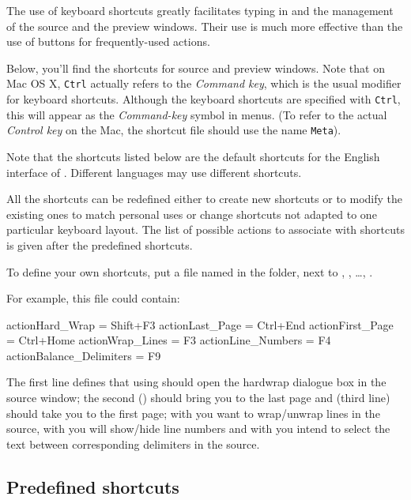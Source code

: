The use of keyboard shortcuts greatly facilitates typing in and the management of the source and the preview windows. Their use is much more effective than the use of buttons for frequently-used actions.

Below, you'll find the shortcuts for source and preview windows. Note that on Mac OS X, \verb|Ctrl| actually refers to the \emph{Command key}, which is the usual modifier for keyboard shortcuts. Although the keyboard shortcuts are specified with \verb|Ctrl|, this will appear as the \emph{Command-key} symbol in menus. (To refer to the actual \emph{Control key} on the Mac, the shortcut file should use the name \verb|Meta|).

Note that the shortcuts listed below are the default shortcuts for the English interface of {\Tw}. Different languages may use different shortcuts.

All the shortcuts can be redefined either to create new shortcuts or to modify the existing ones to match personal uses or change shortcuts not adapted to one particular keyboard layout. The list of possible actions to associate with shortcuts is given after the predefined shortcuts.

To define your own shortcuts, put a file named  in the  folder, next to , , \dots, .

For example, this  file could contain:
\begin{verbExample}
actionHard_Wrap = Shift+F3
actionLast_Page = Ctrl+End
actionFirst_Page = Ctrl+Home
actionWrap_Lines = F3
actionLine_Numbers = F4
actionBalance_Delimiters = F9
\end{verbExample}

The first line defines that using  should open the hardwrap dialogue box in the source window; the second () should bring you to the last page and  (third line) should take you to the first page; with  you want to wrap/unwrap lines in the source, with  you will show/hide line numbers and with  you intend to select the text between corresponding delimiters in the source.

\subsection{Predefined shortcuts}

